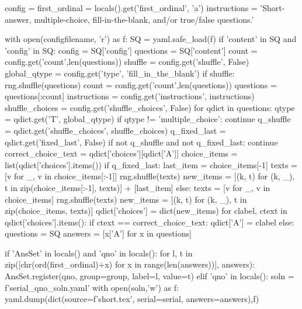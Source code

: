 %
%
%
%  
\begin{pycode}
config = {}
first_ordinal = locals().get('first_ordinal', 'a')
instructions = 'Short-answer, multiple-choice, fill-in-the-blank, and/or true/false questions.'

with open(configfilename, 'r') as f:
    SQ = yaml.safe_load(f)
if 'content' in SQ and 'config' in SQ:
    config = SQ['config']
    questions = SQ['content']
    count = config.get('count',len(questions))
    shuffle = config.get('shuffle', False)
    global_qtype = config.get('type', 'fill_in_the_blank')
    if shuffle: 
        rng.shuffle(questions)
    count = config.get('count',len(questions))
    questions = questions[:count]
    instructions = config.get('instructions', instructions)
    shuffle_choices = config.get('shuffle_choices', False)
    for qdict in questions:
        qtype = qdict.get('T', global_qtype)
        if qtype != 'multiple_choice':
            continue
        q_shuffle = qdict.get('shuffle_choices', shuffle_choices)
        q_fixed_last = qdict.get('fixed_last', False)
        if not q_shuffle and not q_fixed_last:
            continue
        correct_choice_text = qdict['choices'][qdict['A']]
        choice_items = list(qdict['choices'].items())
        if q_fixed_last:
            last_item = choice_items[-1]
            texts = [v for _, v in choice_items[:-1]]
            rng.shuffle(texts)
            new_items = [(k, t) for (k, _), t in zip(choice_items[:-1], texts)] + [last_item]
        else:
            texts = [v for _, v in choice_items]
            rng.shuffle(texts)
            new_items = [(k, t) for (k, _), t in zip(choice_items, texts)]
        qdict['choices'] = dict(new_items)
        for clabel, ctext in qdict['choices'].items():
            if ctext == correct_choice_text:
                qdict['A'] = clabel
else:
    questions = SQ
answers = [x['A'] for x in questions]

if 'AnsSet' in locals() and 'qno' in locals():
    for l, t in zip([chr(ord(first_ordinal)+x) for x in range(len(answers))], answers):
        AnsSet.register(qno, group=group, label=l, value=t)
elif 'qno' in locals():
    soln = f'{serial}_{qno}_soln.yaml'
    with open(soln,'w') as f:
        yaml.dump(dict(source=f'short.tex', serial=serial, answers=answers),f)
\end{pycode}
